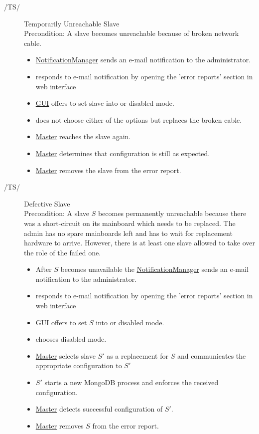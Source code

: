 \documentclass[a4paper, 11pt]{article}
\makeatletter
\def\namedlabel#1#2{\begingroup
    #2%
    \def\@currentlabel{#2}%
    \phantomsection\label{#1}\endgroup
}
\newcommand{\oitem}[2]{
  \@ifundefined{c@oitem#1}{\newcounter{oitem#1}}{} %
  \addtocounter{oitem#1}{10}
  \item[\namedlabel{#1:#2}{/#1\arabic{oitem#1}/}]
}
\makeatother
\begin{document}
\begin{description}
\oitem{TS}{} Temporarily Unreachable Slave \\
Precondition: A slave becomes unreachable because of broken network cable.
\begin{itemize}
	\item \hyperref[SM:NotificationManager]{NotificationManager} sends an e-mail notification to the \gls{administrator}.
	\item {} responds to e-mail notification by opening the 'error reports' section in web interface %
	\item \hyperref[SM:GUI]{GUI} offers to set slave into  or \gls{disabled mode}.
	\item {} does not choose either of the options but replaces the broken cable.
	\item \hyperref[SM:Master]{Master} reaches the slave again.
	\item \hyperref[SM:Master]{Master} determines that configuration is still as expected.
	\item \hyperref[SM:Master]{Master} removes the slave from the error report.
\end{itemize}

\oitem{TS}{} Defective Slave \\
Precondition: A slave $S$ becomes permanently unreachable because there was a short-circuit on its mainboard which needs to be replaced. The admin has no spare mainboards left and has to wait for replacement hardware to arrive. However, there is at least one  slave allowed to take over the role of the failed one.
\begin{itemize}
	\item After $S$ becomes unavailable the \hyperref[SM:NotificationManager]{NotificationManager} sends an e-mail notification to the \gls{administrator}.
	\item {} responds to e-mail notification by opening the 'error reports' section in web interface %
	\item \hyperref[SM:GUI]{GUI} offers to set $S$ into  or \gls{disabled mode}.
	\item {} chooses \gls{disabled mode}.
	\item \hyperref[SM:Master]{Master} selects slave $S'$ as a replacement for $S$ and communicates the appropriate configuration to $S'$
	\item $S'$ starts a new \gls{MongoDB} process and enforces the received configuration.
	\item \hyperref[SM:Master]{Master} detects successful configuration of $S'$.
	\item \hyperref[SM:Master]{Master} removes $S$ from the error report.
\end{itemize}


\end{description}
\end{document}
